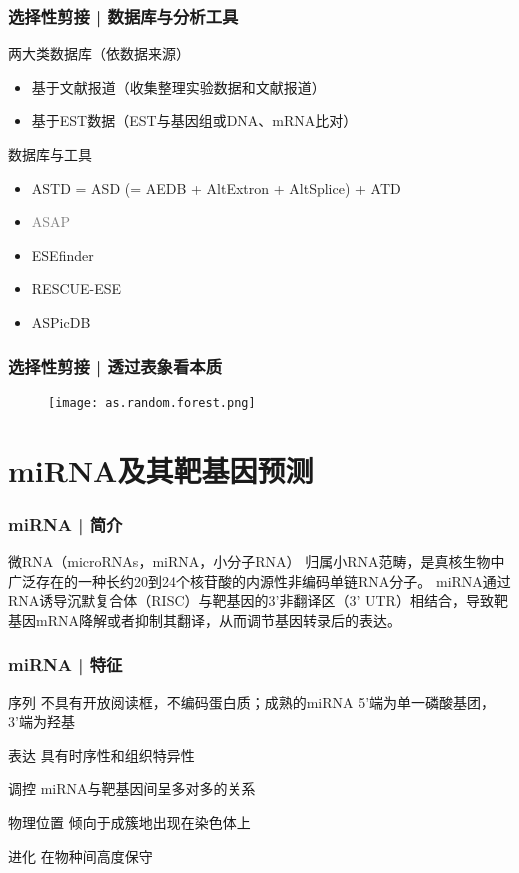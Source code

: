 \begin{frame}
  \frametitle{选择性剪接 | 数据库与分析工具}
  \begin{block}{两大类数据库（依数据来源）}
    \begin{itemize}
      \item 基于文献报道（收集整理实验数据和文献报道）
      \item 基于EST数据（EST与基因组或DNA、mRNA比对）
    \end{itemize}
  \end{block}
  \pause
  \begin{block}{数据库与工具}
  \begin{itemize}
    \item ASTD = ASD (= AEDB + AltExtron + AltSplice) + ATD
    \item \textcolor{gray}{ASAP}
    \item ESEfinder 
    \item RESCUE-ESE
    \item ASPicDB
  \end{itemize}
\end{block}
\end{frame}

\begin{frame}
  \frametitle{选择性剪接 | 透过表象看本质}
  \begin{figure}
    \centering
    \texttt{[image: as.random.forest.png]}
  \end{figure}
\end{frame}

\section{miRNA及其靶基因预测}

\begin{frame}
  \frametitle{miRNA | 简介}
  \begin{block}{微RNA（microRNAs，miRNA，小分子RNA）}
    归属小RNA范畴，是真核生物中广泛存在的一种长约20到24个核苷酸的内源性非编码单链RNA分子。
    miRNA通过RNA诱导沉默复合体（RISC）与靶基因的3'非翻译区（3' UTR）相结合，导致靶基因mRNA降解或者抑制其翻译，从而调节基因转录后的表达。
  \end{block}
\end{frame}

\begin{frame}
  \frametitle{miRNA | 特征}
  \begin{block}{序列}
    不具有开放阅读框，不编码蛋白质；成熟的miRNA 5'端为单一磷酸基团，3'端为羟基
  \end{block}
  \pause
  \begin{block}{表达}
    具有时序性和组织特异性
  \end{block}
  \pause
  \begin{block}{调控}
    miRNA与靶基因间呈多对多的关系
  \end{block}
  \pause
  \begin{block}{物理位置}
    倾向于成簇地出现在染色体上
  \end{block}
  \pause
  \begin{block}{进化}
    在物种间高度保守
  \end{block}
\end{frame}

